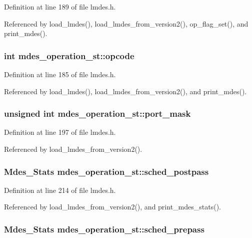 Definition at line 189 of file lmdes.h.

Referenced by load\_\-lmdes(), load\_\-lmdes\_\-from\_\-version2(), op\_\-flag\_\-set(), and print\_\-mdes().
\subsubsection{\setlength{\rightskip}{0pt plus 5cm}int \bf{mdes\_\-operation\_\-st::opcode}}\label{structmdes__operation__st_225a9dcbe1226b4d16ec2b957653baee}




Definition at line 185 of file lmdes.h.

Referenced by load\_\-lmdes(), load\_\-lmdes\_\-from\_\-version2(), and print\_\-mdes().
\subsubsection{\setlength{\rightskip}{0pt plus 5cm}unsigned int \bf{mdes\_\-operation\_\-st::port\_\-mask}}\label{structmdes__operation__st_1044fe9988672fbba3984f30d55e9287}




Definition at line 197 of file lmdes.h.

Referenced by load\_\-lmdes\_\-from\_\-version2().
\subsubsection{\setlength{\rightskip}{0pt plus 5cm}\bf{Mdes\_\-Stats} \bf{mdes\_\-operation\_\-st::sched\_\-postpass}}\label{structmdes__operation__st_c5848d2ae18154a9a07985915fec5368}




Definition at line 214 of file lmdes.h.

Referenced by load\_\-lmdes\_\-from\_\-version2(), and print\_\-mdes\_\-stats().
\subsubsection{\setlength{\rightskip}{0pt plus 5cm}\bf{Mdes\_\-Stats} \bf{mdes\_\-operation\_\-st::sched\_\-prepass}}\label{structmdes__operation__st_7ee0e9a372c01e375ac158eb9f24c0b5}




